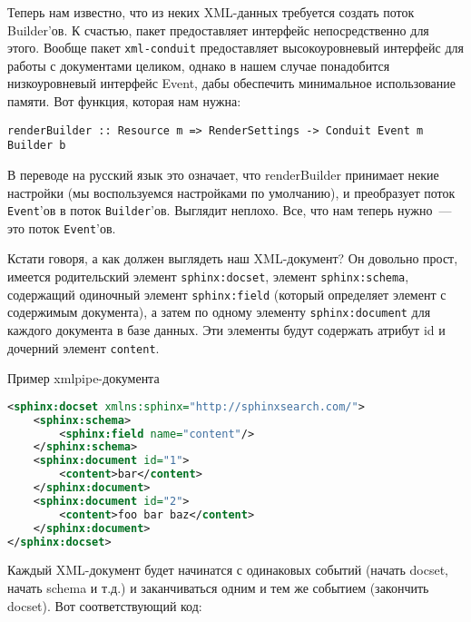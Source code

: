 Теперь нам известно, что из неких XML-данных требуется создать поток Builder'ов. К счастью, пакет  предоставляет интерфейс непосредственно для этого. Вообще пакет \lstinline'xml-conduit' предоставляет высокоуровневый интерфейс для работы с документами целиком, однако в нашем случае понадобится низкоуровневый интерфейс Event, дабы обеспечить минимальное использование памяти. Вот функция, которая нам нужна:

\begin{lstlisting}
renderBuilder :: Resource m => RenderSettings -> Conduit Event m Builder b
\end{lstlisting}

В переводе на русский язык это означает, что renderBuilder принимает некие настройки (мы воспользуемся настройками по умолчанию), и преобразует поток \lstinline!Event!'ов в поток \lstinline!Builder!'ов. Выглядит неплохо. Все, что нам теперь нужно~--- это поток \lstinline!Event!'ов.

Кстати говоря, а как должен выглядеть наш XML-документ? Он довольно прост, имеется родительский элемент \lstinline'sphinx:docset', элемент \lstinline'sphinx:schema', содержащий одиночный элемент \lstinline'sphinx:field' (который определяет элемент с содержимым документа), а затем по одному элементу \lstinline'sphinx:document' для каждого документа в базе данных. Эти элементы будут содержать атрибут id и дочерний элемент \lstinline'content'.

\begin{remark}
Пример xmlpipe-документа %
\begin{lstlisting}[language=XML]
<sphinx:docset xmlns:sphinx="http://sphinxsearch.com/">
    <sphinx:schema>
        <sphinx:field name="content"/>
    </sphinx:schema>
    <sphinx:document id="1">
        <content>bar</content>
    </sphinx:document>
    <sphinx:document id="2">
        <content>foo bar baz</content>
    </sphinx:document>
</sphinx:docset>
\end{lstlisting}
\end{remark}

Каждый XML-документ будет начинатся с одинаковых событий (начать docset, начать schema и т.д.) и заканчиваться одним и тем же событием (закончить docset). Вот соответствующий код: %


